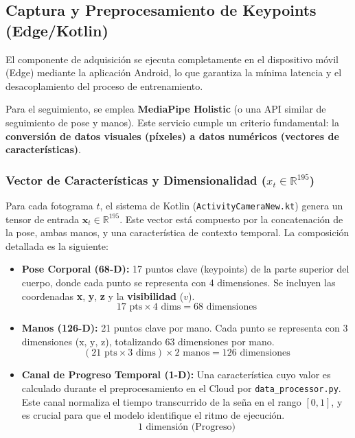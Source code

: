 \subsection{Captura y Preprocesamiento de Keypoints (Edge/Kotlin)}

El componente de adquisición se ejecuta completamente en el dispositivo móvil (Edge) mediante la aplicación Android, lo que garantiza la mínima latencia y el desacoplamiento del proceso de entrenamiento.

Para el seguimiento, se emplea \textbf{MediaPipe Holistic} (o una API similar de seguimiento de pose y manos). Este servicio cumple un criterio fundamental: la \textbf{conversión de datos visuales (píxeles) a datos numéricos (vectores de características)}.

\subsubsection{Vector de Características y Dimensionalidad ($x_t \in \mathbb{R}^{195}$)}

Para cada fotograma $t$, el sistema de Kotlin (\texttt{ActivityCameraNew.kt}) genera un tensor de entrada $\mathbf{x}_t \in \mathbb{R}^{195}$. Este vector está compuesto por la concatenación de la pose, ambas manos, y una característica de contexto temporal. La composición detallada es la siguiente:

\begin{itemize}
    \item \textbf{Pose Corporal (68-D):} 17 puntos clave (keypoints) de la parte superior del cuerpo, donde cada punto se representa con 4 dimensiones. Se incluyen las coordenadas \textbf{x}, \textbf{y}, \textbf{z} y la \textbf{visibilidad} ($v$).
    $$ 17 \text{ pts} \times 4 \text{ dims} = 68 \text{ dimensiones} $$
    \item \textbf{Manos (126-D):} 21 puntos clave por mano. Cada punto se representa con 3 dimensiones ($\text{x, y, z}$), totalizando 63 dimensiones por mano.
    $$ (21 \text{ pts} \times 3 \text{ dims}) \times 2 \text{ manos} = 126 \text{ dimensiones} $$
    \item \textbf{Canal de Progreso Temporal (1-D):} Una característica cuyo valor es calculado durante el preprocesamiento en el Cloud por \texttt{data\_processor.py}. Este canal normaliza el tiempo transcurrido de la seña en el rango $[0, 1]$, y es crucial para que el modelo identifique el ritmo de ejecución.
    $$ 1 \text{ dimensión (Progreso)} $$
\end{itemize}

